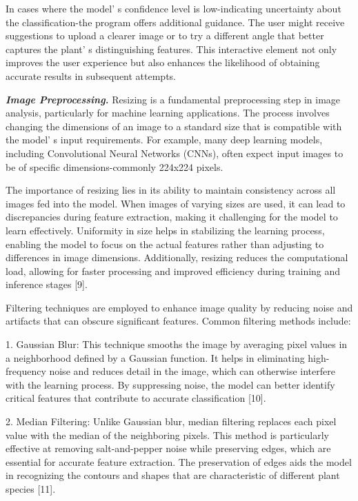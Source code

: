 \begin{multicols}{2}
In cases where the model' s confidence level is
low-indicating uncertainty about the classification-the program offers
additional guidance. The user might receive suggestions to upload a
clearer image or to try a different angle that better captures the
plant' s distinguishing features. This interactive
element not only improves the user experience but also enhances the
likelihood of obtaining accurate results in subsequent attempts.

\emph{{\bfseries Image Preprocessing.}} Resizing is a fundamental
preprocessing step in image analysis, particularly for machine learning
applications. The process involves changing the dimensions of an image
to a standard size that is compatible with the model' s
input requirements. For example, many deep learning models, including
Convolutional Neural Networks (CNNs), often expect input images to be of
specific dimensions-commonly 224x224 pixels.

The importance of resizing lies in its ability to maintain consistency
across all images fed into the model. When images of varying sizes are
used, it can lead to discrepancies during feature extraction, making it
challenging for the model to learn effectively. Uniformity in size helps
in stabilizing the learning process, enabling the model to focus on the
actual features rather than adjusting to differences in image
dimensions. Additionally, resizing reduces the computational load,
allowing for faster processing and improved efficiency during training
and inference stages {[}9{]}.

Filtering techniques are employed to enhance image quality by reducing
noise and artifacts that can obscure significant features. Common
filtering methods include:

1. Gaussian Blur: This technique smooths the image by averaging pixel
values in a neighborhood defined by a Gaussian function. It helps in
eliminating high-frequency noise and reduces detail in the image,
which can otherwise interfere with the learning process. By
suppressing noise, the model can better identify critical features
that contribute to accurate classification {[}10{]}.

2. Median Filtering: Unlike Gaussian blur, median filtering replaces each
pixel value with the median of the neighboring pixels. This method is
particularly effective at removing salt-and-pepper noise while
preserving edges, which are essential for accurate feature extraction.
The preservation of edges aids the model in recognizing the contours
and shapes that are characteristic of different plant species
{[}11{]}.


\end{multicols}
